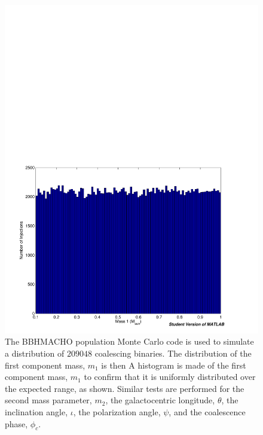 \begin{figure}[p]
\begin{center}
\includegraphics[width=\linewidth]{figures/macho/m1_hist}
\end{center}
\caption[Histogram of BBHMACHO Monte Carlo Mass Distribution]{\label{f:m1_hist}%
The BBHMACHO population Monte Carlo code is used to simulate a distribution of
$209048$ coalescing binaries. The distribution of the first component mass,
$m_1$ is then A histogram is made of the first component mass, $m_1$ to confirm that it is uniformly distributed over the
expected range, as shown. Similar tests are performed for the second mass
parameter, $m_2$, the galactocentric longitude, $\theta$, the inclination
angle, $\iota$, the polarization angle, $\psi$, and the coalescence phase,
$\phi_c$.
}
\end{figure}

